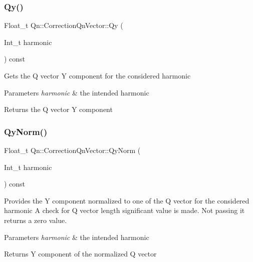 \subsubsection{\texorpdfstring{Qy()}{Qy()}}
{\footnotesize\ttfamily Float\+\_\+t Qn\+::\+Correction\+Qn\+Vector\+::\+Qy (\begin{DoxyParamCaption}\item[{Int\+\_\+t}]{harmonic }\end{DoxyParamCaption}) const\hspace{0.3cm}{\ttfamily [inline]}}

Gets the Q vector Y component for the considered harmonic 
\begin{DoxyParams}{Parameters}
{\em harmonic} & the intended harmonic \\
\hline
\end{DoxyParams}
\begin{DoxyReturn}{Returns}
the Q vector Y component 
\end{DoxyReturn}
\mbox{\label{classQn_1_1CorrectionQnVector_af8c17655a61268b003515554cc146814}} 
\subsubsection{\texorpdfstring{Qy\+Norm()}{QyNorm()}}
{\footnotesize\ttfamily Float\+\_\+t Qn\+::\+Correction\+Qn\+Vector\+::\+Qy\+Norm (\begin{DoxyParamCaption}\item[{Int\+\_\+t}]{harmonic }\end{DoxyParamCaption}) const\hspace{0.3cm}{\ttfamily [inline]}}

Provides the Y component normalized to one of the Q vector for the considered harmonic A check for Q vector length significant value is made. Not passing it returns a zero value. 
\begin{DoxyParams}{Parameters}
{\em harmonic} & the intended harmonic \\
\hline
\end{DoxyParams}
\begin{DoxyReturn}{Returns}
Y component of the normalized Q vector 
\end{DoxyReturn}
\mbox{\label{classQn_1_1CorrectionQnVector_acd45aaacfb58f260eb8b0102cc46ef05}} 
